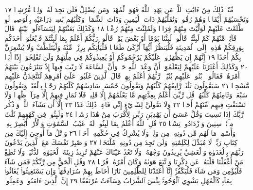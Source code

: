 مِّنْهُۚ ذَٰلِكَ مِنْ ءَايَٰتِ ٱللَّهِۗ مَن يَهْدِ ٱللَّهُ فَهُوَ ٱلْمُهْتَدِۖ وَمَن
يُضْلِلْ فَلَن تَجِدَ لَهُۥ وَلِيࣰّا مُّرْشِدࣰا ١٧ وَتَحْسَبُهُمْ أَيْقَاظࣰا
وَهُمْ رُقُودࣱۚ وَنُقَلِّبُهُمْ ذَاتَ ٱلْيَمِينِ وَذَاتَ ٱلشِّمَالِۖ وَكَلْبُهُم
بَٰسِطࣱ ذِرَاعَيْهِ بِٱلْوَصِيدِۚ لَوِ ٱطَّلَعْتَ عَلَيْهِمْ لَوَلَّيْتَ مِنْهُمْ
فِرَارࣰا وَلَمُلِئْتَ مِنْهُمْ رُعْبࣰا ١٨ وَكَذَٰلِكَ بَعَثْنَٰهُمْ
لِيَتَسَآءَلُوا۟ بَيْنَهُمْۚ قَالَ قَآئِلࣱ مِّنْهُمْ كَمْ لَبِثْتُمْۖ قَالُوا۟ لَبِثْنَا
يَوْمًا أَوْ بَعْضَ يَوْمࣲۚ قَالُوا۟ رَبُّكُمْ أَعْلَمُ بِمَا لَبِثْتُمْ فَٱبْعَثُوٓا۟
أَحَدَكُم بِوَرِقِكُمْ هَٰذِهِۦٓ إِلَى ٱلْمَدِينَةِ فَلْيَنظُرْ أَيُّهَآ أَزْكَىٰ
طَعَامࣰا فَلْيَأْتِكُم بِرِزْقࣲ مِّنْهُ وَلْيَتَلَطَّفْ وَلَا يُشْعِرَنَّ
بِكُمْ أَحَدًا ١٩ إِنَّهُمْ إِن يَظْهَرُوا۟ عَلَيْكُمْ يَرْجُمُوكُمْ
أَوْ يُعِيدُوكُمْ فِي مِلَّتِهِمْ وَلَن تُفْلِحُوٓا۟ إِذًا أَبَدࣰا ٢٠
وَكَذَٰلِكَ أَعْثَرْنَا عَلَيْهِمْ لِيَعْلَمُوٓا۟ أَنَّ وَعْدَ ٱللَّهِ حَقࣱّ وَأَنَّ
ٱلسَّاعَةَ لَا رَيْبَ فِيهَآ إِذْ يَتَنَٰزَعُونَ بَيْنَهُمْ أَمْرَهُمْۖ فَقَالُوا۟
ٱبْنُوا۟ عَلَيْهِم بُنْيَٰنࣰاۖ رَّبُّهُمْ أَعْلَمُ بِهِمْۚ قَالَ ٱلَّذِينَ غَلَبُوا۟ عَلَىٰٓ
أَمْرِهِمْ لَنَتَّخِذَنَّ عَلَيْهِم مَّسْجِدࣰا ٢١ سَيَقُولُونَ ثَلَٰثَةࣱ
رَّابِعُهُمْ كَلْبُهُمْ وَيَقُولُونَ خَمْسَةࣱ سَادِسُهُمْ كَلْبُهُمْ
رَجْمَۢا بِٱلْغَيْبِۖ وَيَقُولُونَ سَبْعَةࣱ وَثَامِنُهُمْ كَلْبُهُمْۚ قُل رَّبِّيٓ
أَعْلَمُ بِعِدَّتِهِم مَّا يَعْلَمُهُمْ إِلَّا قَلِيلࣱۗ فَلَا تُمَارِ فِيهِمْ إِلَّا مِرَآءࣰ
ظَٰهِرࣰا وَلَا تَسْتَفْتِ فِيهِم مِّنْهُمْ أَحَدࣰا ٢٢ وَلَا تَقُولَنَّ لِشَا۟يْءٍ
إِنِّي فَاعِلࣱ ذَٰلِكَ غَدًا ٢٣ إِلَّآ أَن يَشَآءَ ٱللَّهُۚ وَٱذْكُر رَّبَّكَ
إِذَا نَسِيتَ وَقُلْ عَسَىٰٓ أَن يَهْدِيَنِ رَبِّي لِأَقْرَبَ مِنْ هَٰذَا رَشَدࣰا ٢٤
وَلَبِثُوا۟ فِي كَهْفِهِمْ ثَلَٰثَ مِا۟ئَةࣲ سِنِينَ وَٱزْدَادُوا۟ تِسْعࣰا ٢٥
قُلِ ٱللَّهُ أَعْلَمُ بِمَا لَبِثُوا۟ۖ لَهُۥ غَيْبُ ٱلسَّمَٰوَٰتِ وَٱلْأَرْضِۖ
أَبْصِرْ بِهِۦ وَأَسْمِعْۚ مَا لَهُم مِّن دُونِهِۦ مِن وَلِيࣲّ وَلَا يُشْرِكُ
فِي حُكْمِهِۦٓ أَحَدࣰا ٢٦ وَٱتْلُ مَآ أُوحِيَ إِلَيْكَ مِن كِتَابِ
رَبِّكَۖ لَا مُبَدِّلَ لِكَلِمَٰتِهِۦ وَلَن تَجِدَ مِن دُونِهِۦ مُلْتَحَدࣰا ٢٧
وَٱصْبِرْ نَفْسَكَ مَعَ ٱلَّذِينَ يَدْعُونَ رَبَّهُم بِٱلْغَدَوٰةِ وَٱلْعَشِيِّ
يُرِيدُونَ وَجْهَهُۥۖ وَلَا تَعْدُ عَيْنَاكَ عَنْهُمْ تُرِيدُ زِينَةَ ٱلْحَيَوٰةِ
ٱلدُّنْيَاۖ وَلَا تُطِعْ مَنْ أَغْفَلْنَا قَلْبَهُۥ عَن ذِكْرِنَا وَٱتَّبَعَ هَوَىٰهُ وَكَانَ
أَمْرُهُۥ فُرُطࣰا ٢٨ وَقُلِ ٱلْحَقُّ مِن رَّبِّكُمْۖ فَمَن شَآءَ فَلْيُؤْمِن وَمَن
شَآءَ فَلْيَكْفُرْۚ إِنَّآ أَعْتَدْنَا لِلظَّٰلِمِينَ نَارًا أَحَاطَ بِهِمْ سُرَادِقُهَاۚ
وَإِن يَسْتَغِيثُوا۟ يُغَاثُوا۟ بِمَآءࣲ كَٱلْمُهْلِ يَشْوِي ٱلْوُجُوهَۚ بِئْسَ
ٱلشَّرَابُ وَسَآءَتْ مُرْتَفَقًا ٢٩ إِنَّ ٱلَّذِينَ ءَامَنُوا۟ وَعَمِلُوا۟
